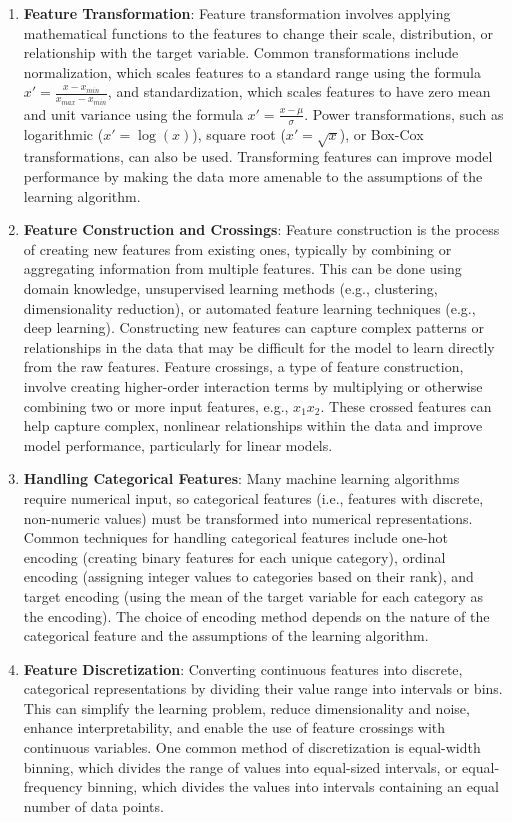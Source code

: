 \documentclass[12pt]{article}
\begin{document}
\begin{enumerate}

\item \textbf{Feature Transformation}: Feature transformation involves applying mathematical functions to the features to change their scale, distribution, or relationship with the target variable. Common transformations include normalization, which scales features to a standard range using the formula $x' = \frac{x - x_{min}}{x_{max} - x_{min}}$, and standardization, which scales features to have zero mean and unit variance using the formula $x' = \frac{x - \mu}{\sigma}$. Power transformations, such as logarithmic ($x' = \log(x)$), square root ($x' = \sqrt{x}$), or Box-Cox transformations, can also be used. Transforming features can improve model performance by making the data more amenable to the assumptions of the learning algorithm.

\item \textbf{Feature Construction and Crossings}: Feature construction is the process of creating new features from existing ones, typically by combining or aggregating information from multiple features. This can be done using domain knowledge, unsupervised learning methods (e.g., clustering, dimensionality reduction), or automated feature learning techniques (e.g., deep learning). Constructing new features can capture complex patterns or relationships in the data that may be difficult for the model to learn directly from the raw features. Feature crossings, a type of feature construction, involve creating higher-order interaction terms by multiplying or otherwise combining two or more input features, e.g., $x_1x_2$. These crossed features can help capture complex, nonlinear relationships within the data and improve model performance, particularly for linear models.

\item \textbf{Handling Categorical Features}: Many machine learning algorithms require numerical input, so categorical features (i.e., features with discrete, non-numeric values) must be transformed into numerical representations. Common techniques for handling categorical features include one-hot encoding (creating binary features for each unique category), ordinal encoding (assigning integer values to categories based on their rank), and target encoding (using the mean of the target variable for each category as the encoding). The choice of encoding method depends on the nature of the categorical feature and the assumptions of the learning algorithm.

\item \textbf{Feature Discretization}: Converting continuous features into discrete, categorical representations by dividing their value range into intervals or bins. This can simplify the learning problem, reduce dimensionality and noise, enhance interpretability, and enable the use of feature crossings with continuous variables. One common method of discretization is equal-width binning, which divides the range of values into equal-sized intervals, or equal-frequency binning, which divides the values into intervals containing an equal number of data points.


\end{enumerate}
\end{document}
